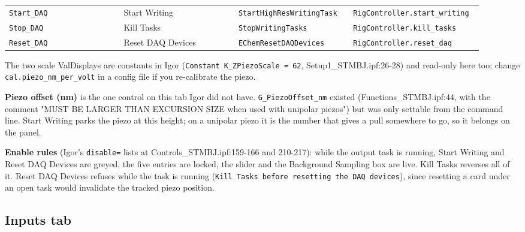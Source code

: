 \begin{longtable}{@{}>{\raggedright\arraybackslash}p{0.230\linewidth}>{\raggedright\arraybackslash}p{0.230\linewidth}>{\raggedright\arraybackslash}p{0.230\linewidth}>{\raggedright\arraybackslash}p{0.230\linewidth}@{}}
\texttt{Start\_\discretionary{}{}{}DAQ} & Start Writing & \texttt{Start\discretionary{}{}{}High\discretionary{}{}{}Res\discretionary{}{}{}Writing\discretionary{}{}{}Task} & \texttt{Rig\discretionary{}{}{}Controller.\discretionary{}{}{}start\_\discretionary{}{}{}writing} \\
\texttt{Stop\_\discretionary{}{}{}DAQ} & Kill Tasks & \texttt{Stop\discretionary{}{}{}Writing\discretionary{}{}{}Tasks} & \texttt{Rig\discretionary{}{}{}Controller.\discretionary{}{}{}kill\_\discretionary{}{}{}tasks} \\
\texttt{Reset\_\discretionary{}{}{}DAQ} & Reset DAQ Devices & \texttt{EChem\discretionary{}{}{}Reset\discretionary{}{}{}DAQDevices} & \texttt{Rig\discretionary{}{}{}Controller.\discretionary{}{}{}reset\_\discretionary{}{}{}daq} \\
\bottomrule
\end{longtable}
\normalsize

The two scale ValDisplays are constants in Igor (\texttt{Constant K\_\discretionary{}{}{}ZPiezo\discretionary{}{}{}Scale = 62}, Setup1\_STMBJ.ipf:26-28) and read-only here too; change \texttt{cal.\discretionary{}{}{}piezo\_\discretionary{}{}{}nm\_\discretionary{}{}{}per\_\discretionary{}{}{}volt} in a config file if you re-calibrate the piezo.

\textbf{Piezo offset (nm)} is the one control on this tab Igor did not have. \texttt{G\_\discretionary{}{}{}Piezo\discretionary{}{}{}Offset\_\discretionary{}{}{}nm} existed (Functions\_STMBJ.ipf:44, with the comment "MUST BE LARGER THAN EXCURSION SIZE when used with unipolar piezos") but was only settable from the command line. Start Writing parks the piezo at this height; on a unipolar piezo it is the number that gives a pull somewhere to go, so it belongs on the panel.

\textbf{Enable rules} (Igor's \texttt{disable=} lists at Controls\_STMBJ.ipf:159-166 and 210-217): while the output task is running, Start Writing and Reset DAQ Devices are greyed, the five entries are locked, the slider and the Background Sampling box are live. Kill Tasks reverses all of it. Reset DAQ Devices refuses while the task is running (\texttt{Kill Tasks before resetting the DAQ devices}), since resetting a card under an open task would invalidate the tracked piezo position.

\subsection{Inputs tab}

